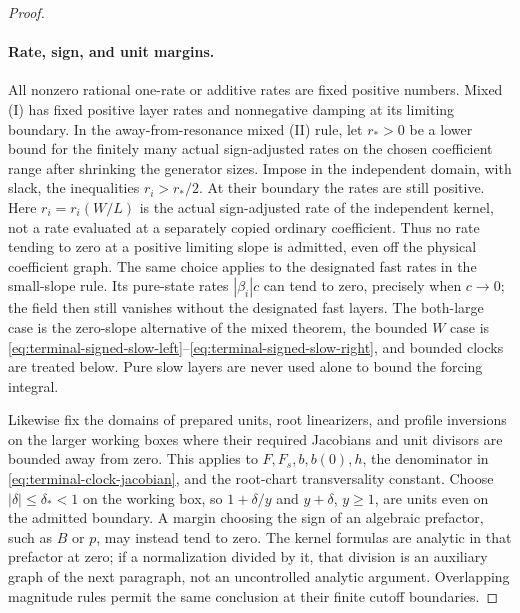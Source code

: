\begin{proof}
\paragraph{Rate, sign, and unit margins.}
All nonzero rational one-rate or additive rates are fixed positive
numbers.  Mixed (I) has fixed positive layer rates and nonnegative
damping at its limiting boundary.  In the away-from-resonance mixed (II)
rule, let \(r_*>0\) be a lower bound for the finitely many actual
sign-adjusted rates on the chosen coefficient range after shrinking the
generator sizes.  Impose in the independent domain, with slack, the
inequalities \(r_i>r_*/2\).  At their boundary the rates are still
positive.  Here \(r_i=r_i(W/L)\) is the actual sign-adjusted rate of
the independent kernel, not a rate evaluated at a separately copied
ordinary coefficient.  Thus no rate tending to zero at a positive limiting
slope is admitted, even off the physical coefficient graph.  The same choice applies to the
designated fast rates in the small-slope rule.  Its pure-state rates
\(|\beta_i|c\) can tend to zero, precisely when \(c\to0\); the field
then still vanishes without the designated fast layers.  The both-large
case is the zero-slope alternative of the mixed theorem, the bounded
\(W\) case is \eqref{eq:terminal-signed-slow-left}--\eqref{eq:terminal-signed-slow-right},
and bounded clocks are treated below.  Pure slow layers are never used
alone to bound the forcing integral.

Likewise fix the domains of prepared units, root linearizers, and profile
inversions on the larger working boxes where their required Jacobians
and unit divisors are bounded away from zero.  This applies to
\(F,F_s,b,b(0),h\), the denominator in
\eqref{eq:terminal-clock-jacobian}, and the root-chart transversality
constant.  Choose \(|\delta|\le\delta_*<1\) on the working box, so
\(1+\delta/y\) and \(y+\delta\), \(y\ge1\), are units even on the
admitted boundary.  A margin choosing the sign of an algebraic prefactor,
such as \(B\) or \(p\), may instead tend to zero.  The kernel formulas
are analytic in that prefactor at zero; if a normalization divided by it,
that division is an auxiliary graph of the next paragraph, not an
uncontrolled analytic argument.  Overlapping magnitude rules permit the
same conclusion at their finite cutoff boundaries.


\end{proof}
